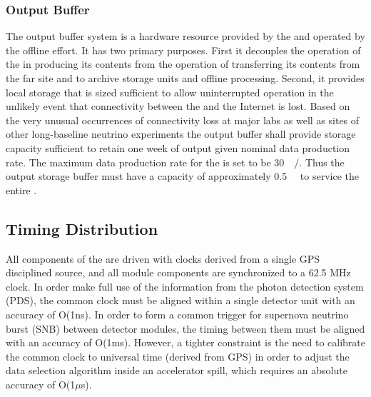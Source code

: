 
\subsubsection{Output Buffer}


The output buffer system is a hardware resource provided by the  and operated by the  offline effort. 
It has two primary purposes. 
First it decouples the operation of the  in producing its contents from the operation of transferring its contents from the far site and to archive storage units and offline processing. 
Second, it provides local storage that is sized sufficient to allow uninterrupted  operation in the unlikely event that connectivity between the  and the Internet is lost. 
Based on the very unusual occurrences of connectivity loss at major labs as well as  sites of other long-baseline neutrino experiments the output buffer shall provide storage capacity sufficient to retain one week of output given nominal data production rate. 
The maximum data production rate for the  is set to be \SI{30}{\peta\byte/\year}. 
Thus the output storage buffer must have a capacity of approximately \SI{0.5}{\peta\byte} to service the entire .




\subsection{Timing Distribution}
\label{sec:sp-daq:design-timing}

All components of the  are driven with clocks derived
from a single GPS disciplined source, and all module components
are synchronized to a 62.5 MHz clock. In order make full use of the
information from the photon detection system (PDS), the common clock
must be aligned within a single detector unit with an accuracy of
O(1ns). In order to form a common trigger for supernova neutrino burst
(SNB) between detector modules, the timing between them must be
aligned with an accuracy of O(1ms). However, a tighter constraint is
the need to calibrate the common clock to universal time (derived from
GPS) in order to adjust the data selection algorithm inside an
accelerator spill, which requires an absolute accuracy of O(1$\mu$s).

